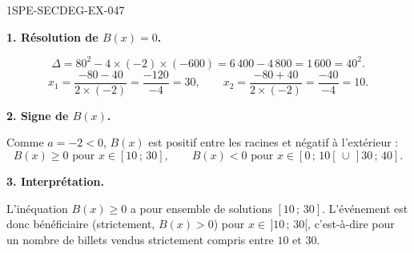 \begin{corrige}{1SPE-SECDEG-EX-047}

\textbf{1. Résolution de $B(x) = 0$.}


\[
\Delta = 80^2 - 4 \times (-2) \times (-600) = 6\,400 - 4\,800 = 1\,600 = 40^2.
\]
\[
x_1 = \frac{-80 - 40}{2 \times (-2)} = \frac{-120}{-4} = 30, \qquad x_2 = \frac{-80 + 40}{2 \times (-2)} = \frac{-40}{-4} = 10.
\]

\medskip
\textbf{2. Signe de $B(x)$.}


Comme $a = -2 < 0$, $B(x)$ est positif entre les racines et négatif à l'extérieur :
\[
B(x) \geqslant 0 \text{ pour } x \in [10\,;\,30], \qquad B(x) < 0 \text{ pour } x \in [0\,;\,10[\,\cup\,]30\,;\,40].
\]

\medskip
\textbf{3. Interprétation.}

L'inéquation $B(x) \geqslant 0$ a pour ensemble de solutions $[10\,;\,30]$. L'événement est donc bénéficiaire (strictement, $B(x) > 0$) pour $x \in \,]10\,;\,30[$, c'est-à-dire pour un nombre de billets vendus strictement compris entre $10$ et $30$.

\end{corrige}
